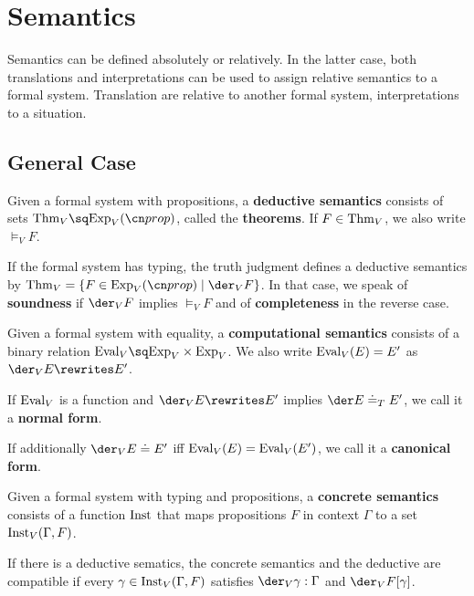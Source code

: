 \section{Semantics}

Semantics can be defined absolutely or relatively.
In the latter case, both translations and interpretations can be used to assign relative semantics to a formal system.
Translation are relative to another formal system, interpretations to a situation.

\subsection{General Case}

\begin{definition}
Given a formal system with propositions, a \textbf{deductive semantics} consists of sets $\Thm_V\sq \Exp_V(\prop)$, called the \textbf{theorems}.
If $F\in\mathrm{Thm}_V$, we also write $\models_V F$.

If the formal system has typing, the truth judgment defines a deductive semantics by $\Thm_V=\{F\in\Exp_V(\prop)\;|\;\der_V F\}$.
In that case, we speak of \textbf{soundness} if $\der_V F$ implies $\models_V F$ and of \textbf{completeness} in the reverse case.
\end{definition}

\begin{definition}
Given a formal system with equality, a \textbf{computational semantics} consists of a binary relation $\Eval_V\sq\Exp_V\times\Exp_V$.
We also write $\mathrm{Eval}_V(E)=E'$ as $\der_V E\rewrites E'$.

If $\mathrm{Eval}_V$ is a function and $\der_V E\rewrites E'$ implies $\der E\doteq_T E'$, we call it a \textbf{normal form}.

If additionally $\der_V E\doteq E'$ iff $\mathrm{Eval}_V(E)=\mathrm{Eval}_V(E')$, we call it a \textbf{canonical form}.
\end{definition}

\begin{definition}
Given a formal system with typing and propositions, a \textbf{concrete semantics} consists of a function $\mathrm{Inst}$ that maps propositions $F$ in context $\Gamma$ to a set $\mathrm{Inst}_V(\Gamma,F)$.

If there is a deductive sematics, the concrete semantics and the deductive are compatible if every $\gamma\in \mathrm{Inst}_V(\Gamma,F)$ satisfies $\der_V \gamma:\Gamma$ and $\der_V F[\gamma]$.
\end{definition}

